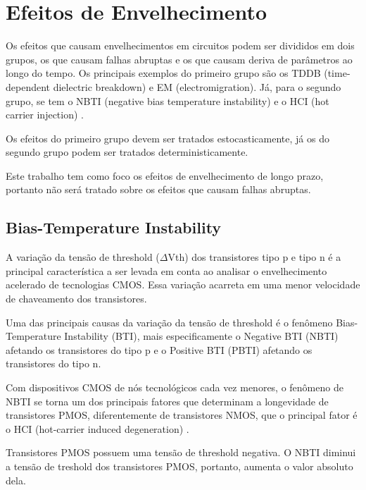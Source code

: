 \section{Efeitos de Envelhecimento}
Os efeitos que causam envelhecimentos em circuitos podem ser divididos em dois grupos, os que causam falhas abruptas e os que causam deriva de parâmetros ao longo do tempo. Os principais exemplos do primeiro grupo são os TDDB (time-dependent dielectric breakdown) e EM (electromigration). Já, para o segundo grupo, se tem o NBTI (negative bias temperature instability) e o HCI (hot carrier injection) \cite{Lorenz}.

Os efeitos do primeiro grupo devem ser tratados estocasticamente, já os do segundo grupo podem ser tratados deterministicamente.

Este trabalho tem como foco os efeitos de envelhecimento de longo prazo, portanto não será tratado sobre os efeitos que causam falhas abruptas.

\subsection{Bias-Temperature Instability}
A variação da tensão de threshold ($\Delta$Vth) dos transistores tipo p e tipo n é a principal característica a ser levada em conta ao analisar o envelhecimento acelerado de tecnologias CMOS. Essa variação acarreta em uma menor velocidade de chaveamento dos transistores.

Uma das principais causas da variação da tensão de threshold é o fenômeno Bias-Temperature Instability (BTI), mais especificamente o Negative BTI (NBTI) afetando os transistores do tipo p e o Positive BTI (PBTI) afetando os transistores do tipo n.

Com dispositivos CMOS de nós tecnológicos cada vez menores, o fenômeno de NBTI se torna um dos principais fatores que determinam a longevidade de transistores PMOS, diferentemente de transistores NMOS, que o principal fator é o HCI (hot-carrier induced degeneration) \cite{Bhardwaj}.

Transistores PMOS possuem uma tensão de threshold negativa. O NBTI diminui a tensão de treshold dos transistores PMOS, portanto, aumenta o valor absoluto dela.



